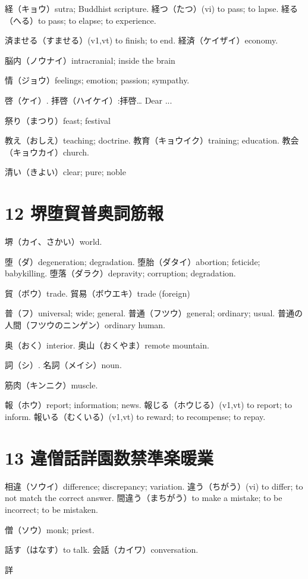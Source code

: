 経（キョウ）sutra; Buddhist scripture.
経つ（たつ）(vi) to pass; to lapse.
経る（へる）to pass; to elapse; to experience.

済ませる（すませる）(v1,vt) to finish; to end.
経済（ケイザイ）economy.

脳内（ノウナイ）intracranial; inside the brain

情（ジョウ）feelings; emotion; passion; sympathy.

啓（ケイ）.
拝啓（ハイケイ）:拝啓… Dear ...

祭り（まつり）feast; festival

教え（おしえ）teaching; doctrine.
教育（キョウイク）training; education.
教会（キョウカイ）church.

清い（きよい）clear; pure; noble

\section{12 堺堕貿普奥詞筋報}

堺（カイ、さかい）world.

堕（ダ）degeneration; degradation.
堕胎（ダタイ）abortion; feticide; babykilling.
堕落（ダラク）depravity; corruption; degradation.

貿（ボウ）trade.
貿易（ボウエキ）trade (foreign)

普（フ）universal; wide; general.
普通（フツウ）general; ordinary; usual.
普通の人間（フツウのニンゲン）ordinary human.

奥（おく）interior.
奥山（おくやま）remote mountain.

詞（シ）.
名詞（メイシ）noun.

筋肉（キンニク）muscle.

報（ホウ）report; information; news.
報じる（ホウじる）(v1,vt) to report; to inform.
報いる（むくいる）(v1,vt) to reward; to recompense; to repay.

\section{13 違僧話詳園数禁準楽暖業}

相違（ソウイ）difference; discrepancy; variation.
違う（ちがう）(vi) to differ; to not match the correct answer.
間違う（まちがう）to make a mistake; to be incorrect; to be mistaken.

僧（ソウ）monk; priest.

話す（はなす）to talk.
会話（カイワ）conversation.

詳

